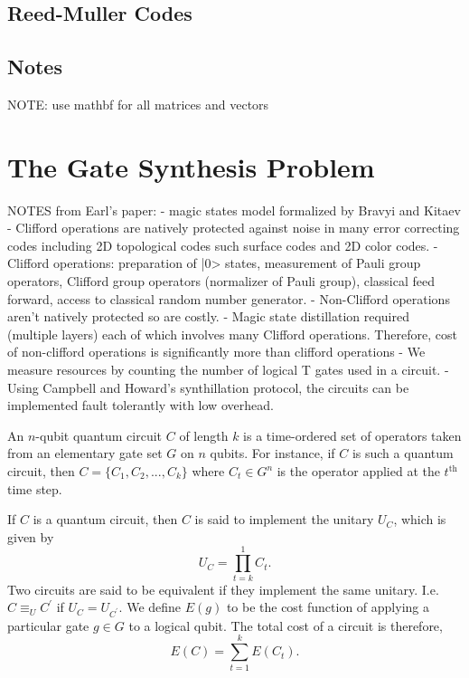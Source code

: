 \documentclass{article}
\theoremstyle{definition}
\theoremstyle{problem}
\theoremstyle{lemma}
\begin{document}
		\subsection{Reed-Muller Codes}
		
		\subsection{Notes}
		NOTE: use mathbf for all matrices and vectors
	
	\section{The Gate Synthesis Problem}
	NOTES from Earl's paper:
		- magic states model formalized by Bravyi and Kitaev
		- Clifford operations are natively protected against noise in many error correcting codes including 2D topological codes such surface codes and 2D color codes.
		- Clifford operations: preparation of |0> states, measurement of Pauli group operators, Clifford group operators (normalizer of Pauli group), classical feed forward, access to classical random number generator.
		- Non-Clifford operations aren't natively protected so are costly.
		- Magic state distillation required (multiple layers) each of which involves many Clifford operations. Therefore, cost of non-clifford operations is significantly more than clifford operations
		- We measure resources by counting the number of logical T gates used in a circuit.
		- Using Campbell and Howard's synthillation protocol, the circuits can be implemented fault tolerantly with low overhead.
	
	An $n$-qubit quantum circuit $C$ of length $k$ is a time-ordered set of operators taken from an elementary gate set $G$ on $n$ qubits. For instance, if $C$ is such a quantum circuit, then $C = \{C_1,C_2,...,C_k\}$ where $C_t\in G^n$ is the operator applied at the $t^\text{th}$ time step.
	
	If $C$ is a quantum circuit, then $C$ is said to implement the unitary $U_C$, which is given by
	\begin{equation}
	U_C = \prod_{t = k}^1 C_t.
	\end{equation}
	Two circuits are said to be equivalent if they implement the same unitary. I.e. $C \equiv_U C^\prime$ if $U_C = U_{C^\prime}$. We define $E(g)$ to be the cost function of applying a particular gate $g\in G$ to a logical qubit. The total cost of a circuit is therefore,
	\begin{equation}
	\label{e_Cost}
	E(C) = \sum_{t=1}^k E(C_t).
	\end{equation}
	
\end{document}
